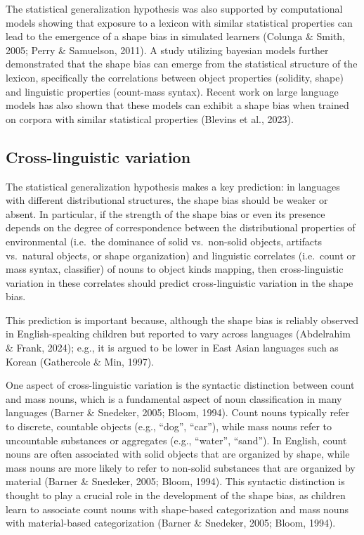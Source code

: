 \documentclass[
  american,
  man,floatsintext]{apa6}
\begin{document}
The statistical generalization hypothesis was also supported by computational models showing that exposure to a lexicon with similar statistical properties can lead to the emergence of a shape bias in simulated learners (Colunga \& Smith, 2005; Perry \& Samuelson, 2011). A study utilizing bayesian models further demonstrated that the shape bias can emerge from the statistical structure of the lexicon, specifically the correlations between object properties (solidity, shape) and linguistic properties (count-mass syntax).
Recent work on large language models has also shown that these models can exhibit a shape bias when trained on corpora with similar statistical properties (Blevins et al., 2023).

\subsection{Cross-linguistic variation}\label{cross-linguistic-variation}

The statistical generalization hypothesis makes a key prediction: in languages with different distributional structures, the shape bias should be weaker or absent. In particular, if the strength of the shape bias or even its presence depends on the degree of correspondence between the distributional properties of environmental (i.e.~the dominance of solid vs.~non-solid objects, artifacts vs.~natural objects, or shape organization) and linguistic correlates (i.e.~count or mass syntax, classifier) of nouns to object kinds mapping, then cross-linguistic variation in these correlates should predict cross-linguistic variation in the shape bias.

This prediction is important because, although the shape bias is reliably observed in English-speaking children but reported to vary across languages (Abdelrahim \& Frank, 2024); e.g., it is argued to be lower in East Asian languages such as Korean (Gathercole \& Min, 1997).

One aspect of cross-linguistic variation is the syntactic distinction between count and mass nouns, which is a fundamental aspect of noun classification in many languages (Barner \& Snedeker, 2005; Bloom, 1994). Count nouns typically refer to discrete, countable objects (e.g., ``dog'', ``car''), while mass nouns refer to uncountable substances or aggregates (e.g., ``water'', ``sand''). In English, count nouns are often associated with solid objects that are organized by shape, while mass nouns are more likely to refer to non-solid substances that are organized by material (Barner \& Snedeker, 2005; Bloom, 1994). This syntactic distinction is thought to play a crucial role in the development of the shape bias, as children learn to associate count nouns with shape-based categorization and mass nouns with material-based categorization (Barner \& Snedeker, 2005; Bloom, 1994).
\end{document}
